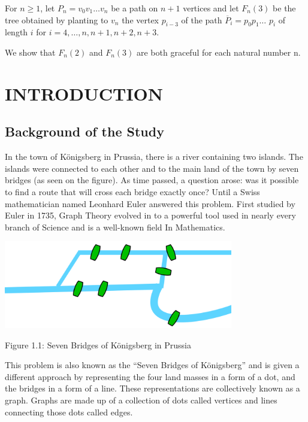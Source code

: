\documentclass[12pt]{report}
\theoremstyle{definition}
\def\indent{\hspace*{.5cm}}
\begin{document}
\indent
For $n\geq1$, let $P_{n}=v_{0}v_{1}$$\ldots$$v_{n}$ be a path on $n+1$ vertices and let $F_{n}(3)$ be the tree obtained by planting to $v_{n}$ the vertex $p_{i-3}$ of the path $\overline{P}_{i}=p_{0}p_{1}\ldots$ $p_{i}$ of length $i$ for $i=4,\ldots,n,n+1,n+2,n+3$.

\indent
We show that $F_{n}(2)$ and $F_{n}(3)$ are both graceful for each natural number n.


\renewcommand{\baselinestretch}{2}


\chapter{INTRODUCTION}
\section{Background of the Study}
\thispagestyle{empty}
\pagestyle{myheadings} 
\setcounter{page}{1}

\indent In the town of K\"{o}nigsberg in Prussia, there is a river containing two islands. The islands were connected to each other and to the main land of the town by seven bridges (as seen on the figure). As time passed, a question arose: was it possible to find a route that will cross each bridge exactly once? Until a Swiss mathematician named Leonhard Euler answered this problem.  First studied by Euler in 1735, Graph Theory evolved in to a powerful tool used in nearly every branch of Science and is a well-known field In Mathematics.
\begin{center}
   \includegraphics[width=10cm]{bridges.png} 
   \begin{center}
       \caption{\label{fig:my-label}Figure 1.1: Seven Bridges of K\"{o}nigsberg in Prussia}
   \end{center}
\end{center}


\indent This problem is also known as the “Seven Bridges of K\"{o}nigsberg” and is given a different approach by representing the four land masses in a form of a dot, and the bridges in a form of a line. These representations are collectively known as a graph. Graphs are made up of a collection of dots called vertices and lines connecting those dots called edges.\\
\end{document}

